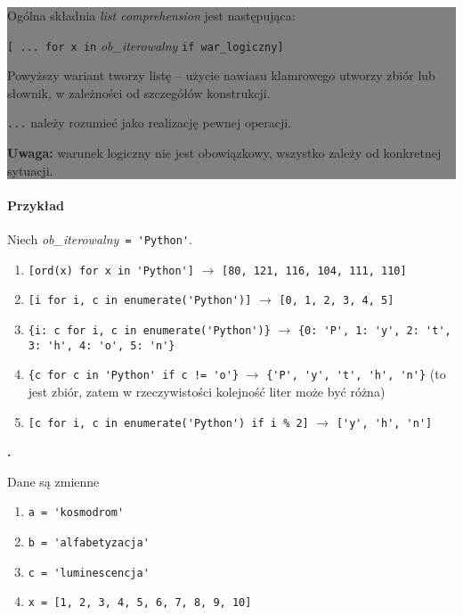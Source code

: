 \documentclass[a4paper]{article}
\newcommand{\important}[1]{
    \begin{center}\colorbox{gray}{
        \begin{minipage}[t]{0.9\textwidth}{#1}
        \end{minipage}
    }
    \end{center}
}
\begin{document}
\important{Ogólna składnia \emph{list comprehension} jest następująca:

\vspace{.5em}
\centerline{\texttt{[ ... for x in} \emph{ob\_iterowalny} \texttt{if war\_logiczny]}}
\vspace{.5em}
Powyższy wariant tworzy listę -- użycie nawiasu klamrowego utworzy zbiór lub słownik, w zależności od szczegółów konstrukcji.

\vspace{.5em}

\texttt{...} należy rozumieć jako realizację pewnej operacji.

\vspace{.5em}

\textbf{Uwaga:} warunek logiczny nie jest obowiązkowy, wszystko zależy od konkretnej sytuacji.
}

\paragraph{Przykład} Niech \emph{ob\_iterowalny}\verb| = 'Python'|.
\begin{enumerate}[]
    \item \verb|[ord(x) for x in 'Python']| $\rightarrow$ \verb|[80, 121, 116, 104, 111, 110]|
    \item \verb|[i for i, c in enumerate('Python')]| $\rightarrow$ \verb|[0, 1, 2, 3, 4, 5]|
    \item \verb|{i: c for i, c in enumerate('Python')}| $\rightarrow$\newline
    \verb|{0: 'P', 1: 'y', 2: 't', 3: 'h', 4: 'o', 5: 'n'}|
    \item \verb|{c for c in 'Python' if c != 'o'}| $\rightarrow$ \verb|{'P', 'y', 't', 'h', 'n'}| (to jest zbiór, zatem w rzeczywistości kolejność liter może być różna)
    \item \verb|[c for i, c in enumerate('Python') if i % 2]| $\rightarrow$ \verb|['y', 'h', 'n']|
\end{enumerate}

\textbf{.}\addtocounter{zadanie}{1} Dane są zmienne
\begin{enumerate}[]
    \item \verb|a = 'kosmodrom'|
    \item \verb|b = 'alfabetyzacja'|
    \item \verb|c = 'luminescencja'|
    \item \verb|x = [1, 2, 3, 4, 5, 6, 7, 8, 9, 10]|
\end{enumerate}
\end{document}
